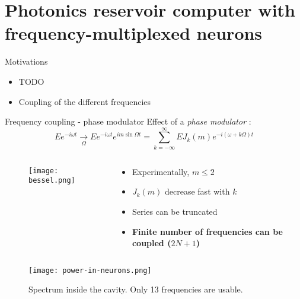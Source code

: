 \section[Photonics RC with frequency-multiplexed neurons]{Photonics reservoir computer with frequency-multiplexed neurons}

\begin{frame}{Motivations}
	\begin{itemize}
		\item \alert{TODO}
		\item Coupling of the different frequencies
	\end{itemize}
\end{frame}

\begin{frame}[allowframebreaks]{Frequency coupling - phase modulator}
	Effect of a \emph{phase modulator} :
	\begin{equation}
		Ee^{-i\omega t} \underset{\Omega}{\rightarrow} Ee^{-i\omega t}e^{im\sin{\Omega t}}= \sum_{k=-\infty}^{\infty} E J_k(m) e^{-i(\omega+k\Omega)t}
	\end{equation}
	
	
	\begin{columns}
	\begin{column}{.5\textwidth}
		\begin{figure}
		\texttt{[image: bessel.png]}
		\end{figure}

	\end{column}
	\begin{column}{.48\textwidth}
			\begin{itemize}
			\item Experimentally, $m \leq 2$
			\item $J_k (m)$ decrease fast with $k$
			\item Series can be truncated
			\item \textbf{Finite number of frequencies can be coupled ($2N+1$)}
		\end{itemize}
	\end{column}%
	\hfill
	\end{columns}
	
	\begin{figure}
		\texttt{[image: power-in-neurons.png]}
		\caption{Spectrum inside the cavity. Only 13 frequencies are usable. \cite{AkroutAkram2016Pprc}}
	\end{figure}
	
\end{frame}

